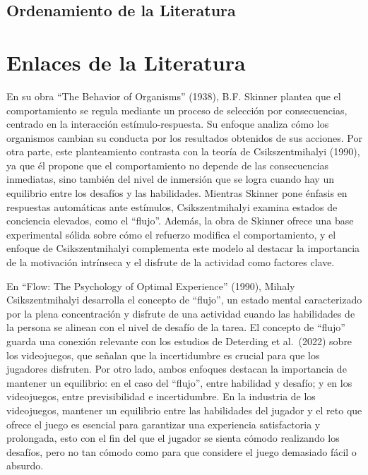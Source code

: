 \documentclass[
  letterpaper,
  DIV=11,
  numbers=noendperiod]{scrreprt}
\begin{document}
\section{Ordenamiento de la
Literatura}\label{ordenamiento-de-la-literatura}


\chapter{Enlaces de la Literatura}\label{enlaces-de-la-literatura}

En su obra ``The Behavior of Organisms'' (1938), B.F. Skinner plantea
que el comportamiento se regula mediante un proceso de selección por
consecuencias, centrado en la interacción estímulo-respuesta. Su enfoque
analiza cómo los organismos cambian su conducta por los resultados
obtenidos de sus acciones. Por otra parte, este planteamiento contrasta
con la teoría de Csikszentmihalyi (1990), ya que él propone que el
comportamiento no depende de las consecuencias inmediatas, sino también
del nivel de inmersión que se logra cuando hay un equilibrio entre los
desafíos y las habilidades. Mientras Skinner pone énfasis en respuestas
automáticas ante estímulos, Csikszentmihalyi examina estados de
conciencia elevados, como el ``flujo''. Además, la obra de Skinner
ofrece una base experimental sólida sobre cómo el refuerzo modifica el
comportamiento, y el enfoque de Csikszentmihalyi complementa este modelo
al destacar la importancia de la motivación intrínseca y el disfrute de
la actividad como factores clave.

En ``Flow: The Psychology of Optimal Experience'' (1990), Mihaly
Csikszentmihalyi desarrolla el concepto de ``flujo'', un estado mental
caracterizado por la plena concentración y disfrute de una actividad
cuando las habilidades de la persona se alinean con el nivel de desafío
de la tarea. El concepto de ``flujo'' guarda una conexión relevante con
los estudios de Deterding et al.~(2022) sobre los videojuegos, que
señalan que la incertidumbre es crucial para que los jugadores
disfruten. Por otro lado, ambos enfoques destacan la importancia de
mantener un equilibrio: en el caso del ``flujo'', entre habilidad y
desafío; y en los videojuegos, entre previsibilidad e incertidumbre. En
la industria de los videojuegos, mantener un equilibrio entre las
habilidades del jugador y el reto que ofrece el juego es esencial para
garantizar una experiencia satisfactoria y prolongada, esto con el fin
del que el jugador se sienta cómodo realizando los desafíos, pero no tan
cómodo como para que considere el juego demasiado fácil o absurdo.
\end{document}
